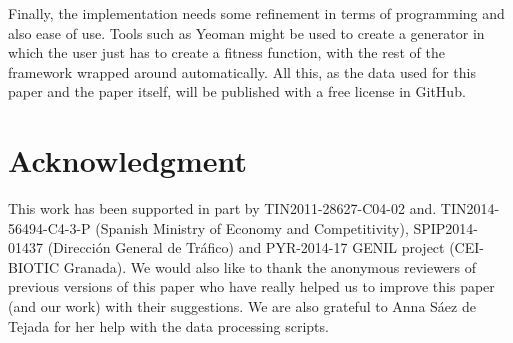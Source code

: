 \documentclass[journal,onecolumn]{IEEEtran}
\begin{document}
Finally, the implementation needs some refinement in terms of
programming and also ease of use. Tools such as Yeoman might be used
to create a generator in which the user just has to create a fitness
function, with the rest of the framework wrapped around
automatically. All this, as the data used for this paper and the paper
itself, will be published with a free license in GitHub.

\section*{Acknowledgment}

This work has been supported in part by TIN2011-28627-C04-02 and.
TIN2014-56494-C4-3-P (Spanish Ministry of Economy and Competitivity),
SPIP2014-01437 (Direcci{\'o}n General de Tr{\'a}fico) and PYR-2014-17
GENIL project (CEI-BIOTIC Granada). We would also like to thank the
anonymous reviewers of previous versions of this paper who have really helped us to improve
this paper (and our work) with their suggestions. We are also grateful
to Anna S\'aez de Tejada for her help with the data processing scripts.



\end{document}
